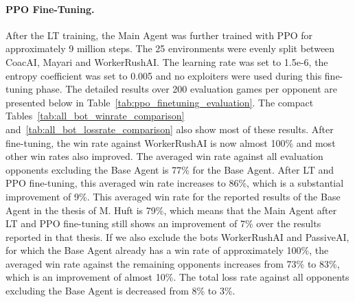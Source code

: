 \documentclass[10pt,twocolumn,letterpaper]{article}
\begin{document}
\FloatBarrier


\paragraph{PPO Fine-Tuning.}
After the LT training, the Main Agent was further trained with PPO for approximately 9 million steps.
The 25 environments were evenly split between CoacAI, Mayari and WorkerRushAI.
The learning rate was set to 1.5e-6, the entropy coefficient was set to 0.005 and no exploiters were used during this fine-tuning phase.
The detailed results over 200 evaluation games per opponent are presented below in Table~\ref{tab:ppo_finetuning_evaluation}.
The compact Tables~\ref{tab:all_bot_winrate_comparison} and~\ref{tab:all_bot_lossrate_comparison} also show most of these results.
After fine-tuning, the win rate against WorkerRushAI is now almost 100\% and most other win rates also improved.
The averaged win rate against all evaluation opponents excluding the Base Agent is 77\% for the Base Agent.
After LT and PPO fine-tuning, this averaged win rate increases to 86\%, which is a substantial improvement of 9\%.
This averaged win rate for the reported results of the Base Agent in the thesis of M. Huft \cite{huft2023microrts} is 79\%, which means that the Main Agent after LT and PPO fine-tuning still shows an improvement of 7\% over the results reported in that thesis.
If we also exclude the bots WorkerRushAI and PassiveAI, for which the Base Agent already has a win rate of approximately 100\%, the averaged win rate against the remaining opponents increases from 73\% to 83\%, which is an improvement of almost 10\%.
The total loss rate against all opponents excluding the Base Agent is decreased from 8\% to 3\%.



\end{document}
